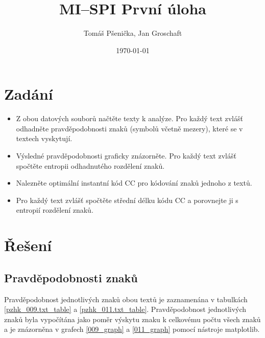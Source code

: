 \documentclass[12pt]{article}
\title{MI--SPI První úloha}
\author{Tomáš Pšenička, Jan Groschaft}
\date{\today}
\begin{document}
 
\begin{titlingpage}
	\maketitle
\end{titlingpage}
 	
	\newpage
 
	\tableofcontents

	\newpage

 	\section{Zadání}
 	
 	\begin{itemize}
 		\item Z obou datových souborů načtěte texty k analýze. Pro každý text zvlášť odhadněte pravděpodobnosti znaků (symbolů včetně mezery), které se v textech vyskytují. 
 		
 		\item Výsledné pravděpodobnosti graficky znázorněte. Pro každý text zvlášť spočtěte entropii odhadnutého rozdělení znaků. 
 		
 		\item Nalezněte optimální instantní kód CC pro kódování znaků jednoho z textů.
 		
 		\item Pro každý text zvlášť spočtěte střední délku kódu CC a porovnejte ji s entropií rozdělení znaků.
 	\end{itemize}
   		
   		
	\section{Řešení}\label{r}
		\subsection{Pravděpodobnosti znaků}\label{pz}
			Pravděpodobnost jednotlivých znaků obou textů je zaznamenána v tabulkách \ref{pzhk_009.txt_table} a \ref{pzhk_011.txt_table}. Pravděpodobnost jednotlivých znaků byla vypočítána jako poměr výskytu znaku k celkovému počtu všech znaků a je znázorněna v grafech \ref{009_graph} a \ref{011_graph} pomocí nástroje matplotlib.
						
\end{document}
